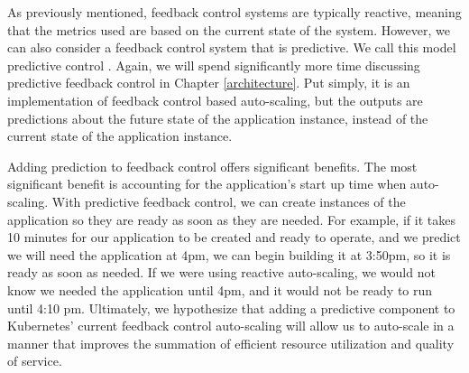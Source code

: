 As previously mentioned, feedback control systems are typically reactive,
meaning that the metrics used are based on the current state of the system.
However, we can also consider a feedback control system that is predictive. We
call this model predictive control
\cite{auto-scaling-techniques-for-elastic-applications-in-cloud-environments}.
Again, we will spend significantly more time discussing predictive feedback
control in Chapter \ref{architecture}.
Put simply, it is an implementation of feedback control
based auto-scaling, but the outputs are predictions about the future state of
the application instance, instead of the current state of the application instance.

Adding prediction to feedback control offers significant benefits. The most
significant benefit is accounting for the application's start up time when auto-scaling.
With predictive feedback control, we can create instances of the application
so they are ready as soon as they are needed. For example, if it takes 10
minutes for our application to be created and ready to operate, and we predict
we will need the application at 4pm, we can begin building it at 3:50pm, so it
is ready as soon as needed. If we were using reactive auto-scaling, we
would not know we needed the application until 4pm, and it would not be ready to
run until 4:10 pm. Ultimately, we hypothesize that adding a predictive component to
Kubernetes' current feedback control auto-scaling will allow us to auto-scale in
a manner that improves the summation of efficient resource utilization and
quality of service.
